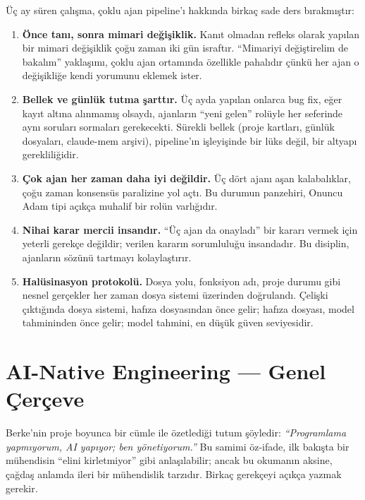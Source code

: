 Üç ay süren çalışma, çoklu ajan pipeline'ı hakkında birkaç sade ders
bırakmıştır:

\begin{enumerate}
  \item \textbf{Önce tanı, sonra mimari değişiklik.}
        Kanıt olmadan refleks olarak yapılan bir mimari değişiklik
        çoğu zaman iki gün israftır. ``Mimariyi değiştirelim de
        bakalım'' yaklaşımı, çoklu ajan ortamında özellikle pahalıdır
        çünkü her ajan o değişikliğe kendi yorumunu eklemek ister.
  \item \textbf{Bellek ve günlük tutma şarttır.}
        Üç ayda yapılan onlarca bug fix, eğer kayıt altına alınmamış
        olsaydı, ajanların ``yeni gelen'' rolüyle her seferinde aynı
        soruları sormaları gerekecekti. Sürekli bellek
        (proje kartları, günlük dosyaları, claude-mem arşivi),
        pipeline'ın işleyişinde bir lüks değil, bir altyapı
        gerekliliğidir.
  \item \textbf{Çok ajan her zaman daha iyi değildir.}
        Üç dört ajanı aşan kalabalıklar, çoğu zaman konsensüs
        paralizine yol açtı. Bu durumun panzehiri, Onuncu Adam tipi
        açıkça muhalif bir rolün varlığıdır.
  \item \textbf{Nihai karar mercii insandır.}
        ``Üç ajan da onayladı'' bir kararı vermek için yeterli
        gerekçe değildir; verilen kararın sorumluluğu insandadır.
        Bu disiplin, ajanların sözünü tartmayı kolaylaştırır.
  \item \textbf{Halüsinasyon protokolü.}
        Dosya yolu, fonksiyon adı, proje durumu gibi nesnel
        gerçekler her zaman dosya sistemi üzerinden doğrulandı.
        Çelişki çıktığında dosya sistemi, hafıza dosyasından önce
        gelir; hafıza dosyası, model tahmininden önce gelir; model
        tahmini, en düşük güven seviyesidir.
\end{enumerate}

\section{AI-Native Engineering — Genel Çerçeve}
\label{sec:ma_ai_native}

Berke'nin proje boyunca bir cümle ile özetlediği tutum şöyledir:
\emph{``Programlama yapmıyorum, AI yapıyor; ben yönetiyorum.''} Bu
samimi öz-ifade, ilk bakışta bir mühendisin ``elini kirletmiyor''
gibi anlaşılabilir; ancak bu okumanın aksine, çağdaş anlamda ileri
bir mühendislik tarzıdır. Birkaç gerekçeyi açıkça yazmak gerekir.

